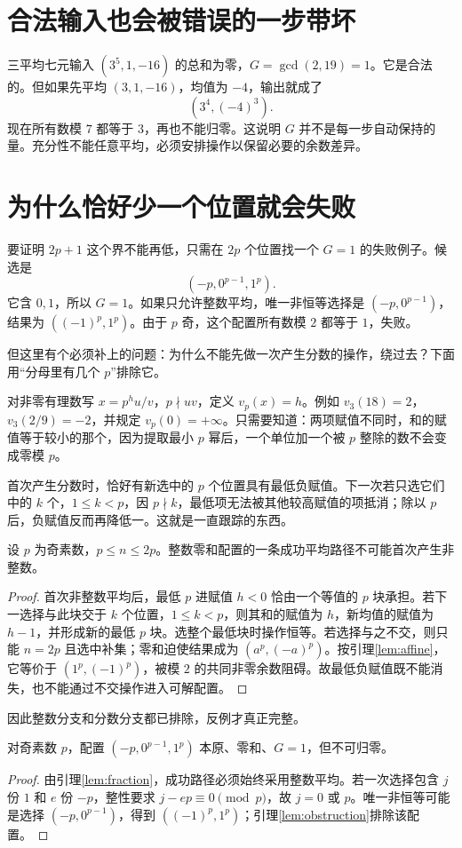 \section{合法输入也会被错误的一步带坏}
三平均七元输入 $(3^5,1,-16)$ 的总和为零，$G=\gcd(2,19)=1$。它是合法的。但如果先平均 $(3,1,-16)$，均值为 $-4$，输出就成了
\[(3^4,(-4)^3).
\]
现在所有数模 $7$ 都等于 $3$，再也不能归零。这说明 $G$ 并不是每一步自动保持的量。充分性不能任意平均，必须安排操作以保留必要的余数差异。

\section{为什么恰好少一个位置就会失败}
要证明 $2p+1$ 这个界不能再低，只需在 $2p$ 个位置找一个 $G=1$ 的失败例子。候选是
\[(-p,0^{p-1},1^p).
\]
它含 $0,1$，所以 $G=1$。如果只允许整数平均，唯一非恒等选择是 $(-p,0^{p-1})$，结果为 $((-1)^p,1^p)$。由于 $p$ 奇，这个配置所有数模 $2$ 都等于 $1$，失败。

但这里有个必须补上的问题：为什么不能先做一次产生分数的操作，绕过去？下面用“分母里有几个 $p$”排除它。

对非零有理数写 $x=p^h u/v$，$p\nmid uv$，定义 $v_p(x)=h$。例如 $v_3(18)=2$，$v_3(2/9)=-2$，并规定 $v_p(0)=+\infty$。只需要知道：两项赋值不同时，和的赋值等于较小的那个，因为提取最小 $p$ 幂后，一个单位加一个被 $p$ 整除的数不会变成零模 $p$。

首次产生分数时，恰好有新选中的 $p$ 个位置具有最低负赋值。下一次若只选它们中的 $k$ 个，$1\le k<p$，因 $p\nmid k$，最低项无法被其他较高赋值的项抵消；除以 $p$ 后，负赋值反而再降低一。这就是一直跟踪的东西。
\begin{lemma}[小维数中首次分数化不可挽回]\label{lem:fraction}
设 $p$ 为奇素数，$p\le n\le2p$。整数零和配置的一条成功平均路径不可能首次产生非整数。
\end{lemma}
\begin{proof}
首次非整数平均后，最低 $p$ 进赋值 $h<0$ 恰由一个等值的 $p$ 块承担。若下一选择与此块交于 $k$ 个位置，$1\le k<p$，则其和的赋值为 $h$，新均值的赋值为 $h-1$，并形成新的最低 $p$ 块。选整个最低块时操作恒等。若选择与之不交，则只能 $n=2p$ 且选中补集；零和迫使结果成为 $(a^p,(-a)^p)$。按引理\ref{lem:affine}，它等价于 $(1^p,(-1)^p)$，被模 $2$ 的共同非零余数阻碍。故最低负赋值既不能消失，也不能通过不交操作进入可解配置。
\end{proof}
因此整数分支和分数分支都已排除，反例才真正完整。
\begin{proposition}[位于2p的反例]\label{prop:lower}
对奇素数 $p$，配置 $(-p,0^{p-1},1^p)$ 本原、零和、$G=1$，但不可归零。
\end{proposition}
\begin{proof}
由引理\ref{lem:fraction}，成功路径必须始终采用整数平均。若一次选择包含 $j$ 份 $1$ 和 $e$ 份 $-p$，整性要求 $j-ep\equiv0\pmod p$，故 $j=0$ 或 $p$。唯一非恒等可能是选择 $(-p,0^{p-1})$，得到 $((-1)^p,1^p)$；引理\ref{lem:obstruction}排除该配置。
\end{proof}

